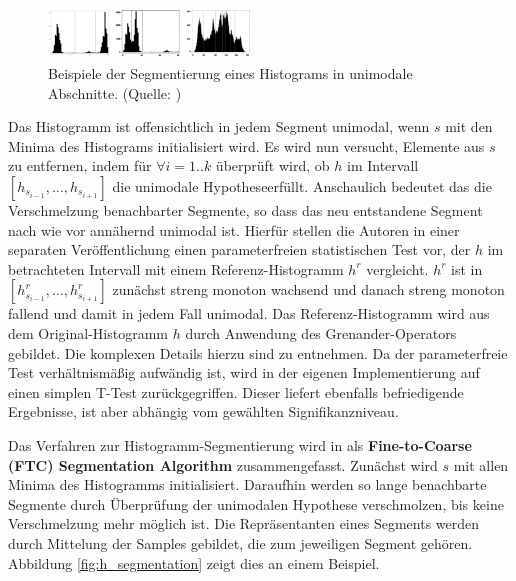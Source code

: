 \documentclass[11pt,a4paper,bibliography=totoc,twocolumn]{scrartcl}
\begin{document}
\begin{figure}[h]
\centering
\includegraphics[width=0.48\textwidth]{img/unimodal.png}
\caption{Beispiele der Segmentierung eines Histograms in unimodale Abschnitte. (Quelle: \citep{acopa})}
\label{fig:unimodal}
\end{figure}

Das Histogramm ist offensichtlich in jedem Segment unimodal, wenn $s$ mit den Minima des Histograms initialisiert wird. Es wird nun versucht, Elemente aus $s$ zu entfernen, indem für $\forall i = 1 .. k$ überprüft wird, ob $h$ im Intervall $[h_{s_{i-1}}, \ldots,  h_{s_{i+1}}]$ die \glqq unimodale Hypothese\grqq  erfüllt. Anschaulich bedeutet das die Verschmelzung benachbarter Segmente, so dass das neu entstandene Segment nach wie vor \glqq annähernd unimodal ist\grqq. Hierfür stellen die Autoren in einer separaten Veröffentlichung \citep{ftc} einen parameterfreien statistischen Test vor, der $h$ im betrachteten Intervall mit einem Referenz-Histogramm $h^r$ vergleicht. $h^r$ ist in $[h^r_{s_{i-1}}, \ldots,  h^r_{s_{i+1}}]$ zunächst streng monoton wachsend und danach streng monoton fallend und damit in jedem Fall unimodal. Das Referenz-Histogramm wird aus dem Original-Histogramm $h$ durch Anwendung des Grenander-Operators gebildet. Die komplexen Details hierzu sind \citep{acopa, ftc} zu entnehmen. Da der parameterfreie Test verhältnismäßig aufwändig ist, wird in der eigenen Implementierung auf einen simplen T-Test zurückgegriffen. Dieser liefert ebenfalls befriedigende Ergebnisse, ist aber abhängig vom gewählten Signifikanzniveau.

Das Verfahren zur Histogramm-Segmentierung wird in \citep{ftc} als \textbf{Fine-to-Coarse (FTC) Segmentation Algorithm} zusammengefasst. Zunächst wird $s$ mit allen Minima des Histogramms initialisiert. Daraufhin werden so lange benachbarte Segmente durch Überprüfung der unimodalen Hypothese verschmolzen, bis keine Verschmelzung mehr möglich ist. Die Repräsentanten eines Segments werden durch Mittelung der Samples gebildet, die zum jeweiligen Segment gehören. Abbildung \ref{fig:h_segmentation} zeigt dies an einem Beispiel.
\end{document}
